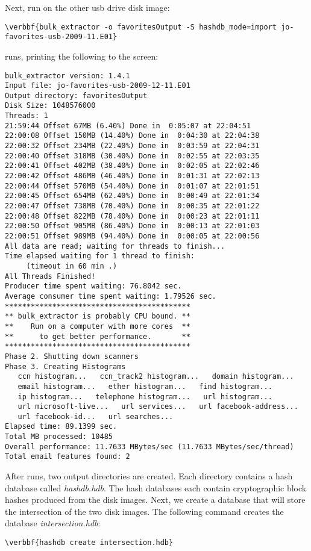 Next, run \bulk on the other usb drive disk image:
\begin{Verbatim}[commandchars=\\\{\}]
\verbbf{bulk_extractor -o favoritesOutput -S hashdb_mode=import jo-favorites-usb-2009-11.E01}
\end{Verbatim}

\bulk runs, printing the following to the screen: 
\begingroup
\footnotesize
\begin{Verbatim}[fontfamily=courier]
bulk_extractor version: 1.4.1
Input file: jo-favorites-usb-2009-12-11.E01
Output directory: favoritesOutput
Disk Size: 1048576000
Threads: 1
21:59:44 Offset 67MB (6.40%) Done in  0:05:07 at 22:04:51
22:00:08 Offset 150MB (14.40%) Done in  0:04:30 at 22:04:38
22:00:32 Offset 234MB (22.40%) Done in  0:03:59 at 22:04:31
22:00:40 Offset 318MB (30.40%) Done in  0:02:55 at 22:03:35
22:00:41 Offset 402MB (38.40%) Done in  0:02:05 at 22:02:46
22:00:42 Offset 486MB (46.40%) Done in  0:01:31 at 22:02:13
22:00:44 Offset 570MB (54.40%) Done in  0:01:07 at 22:01:51
22:00:45 Offset 654MB (62.40%) Done in  0:00:49 at 22:01:34
22:00:47 Offset 738MB (70.40%) Done in  0:00:35 at 22:01:22
22:00:48 Offset 822MB (78.40%) Done in  0:00:23 at 22:01:11
22:00:50 Offset 905MB (86.40%) Done in  0:00:13 at 22:01:03
22:00:51 Offset 989MB (94.40%) Done in  0:00:05 at 22:00:56
All data are read; waiting for threads to finish...
Time elapsed waiting for 1 thread to finish:
     (timeout in 60 min .)
All Threads Finished!
Producer time spent waiting: 76.8042 sec.
Average consumer time spent waiting: 1.79526 sec.
*******************************************
** bulk_extractor is probably CPU bound. **
**    Run on a computer with more cores  **
**      to get better performance.       **
*******************************************
Phase 2. Shutting down scanners
Phase 3. Creating Histograms
   ccn histogram...   ccn_track2 histogram...   domain histogram...
   email histogram...   ether histogram...   find histogram...
   ip histogram...   telephone histogram...   url histogram...
   url microsoft-live...   url services...   url facebook-address...
   url facebook-id...   url searches...
Elapsed time: 89.1399 sec.
Total MB processed: 10485
Overall performance: 11.7633 MBytes/sec (11.7633 MBytes/sec/thread)
Total email features found: 2
\end{Verbatim}
\endgroup

After \bulk runs, two output directories are created. Each directory contains a hash database called \textit{hashdb.hdb}. The hash databases each contain cryptographic block hashes produced from the disk images. Next, we create a database that will store the intersection of the two disk images. The following command creates the database \textit{intersection.hdb}:
\begin{Verbatim}[commandchars=\\\{\}]
\verbbf{hashdb create intersection.hdb}
\end{Verbatim}

